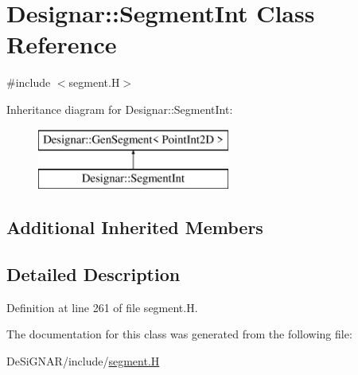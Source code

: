 \hypertarget{class_designar_1_1_segment_int}{}\section{Designar\+:\+:Segment\+Int Class Reference}
\label{class_designar_1_1_segment_int}


{\ttfamily \#include $<$segment.\+H$>$}

Inheritance diagram for Designar\+:\+:Segment\+Int\+:\begin{figure}[H]
\begin{center}
\leavevmode
\includegraphics[height=2.000000cm]{class_designar_1_1_segment_int}
\end{center}
\end{figure}
\subsection*{Additional Inherited Members}


\subsection{Detailed Description}


Definition at line 261 of file segment.\+H.



The documentation for this class was generated from the following file\+:\begin{DoxyCompactItemize}
\item 
De\+Si\+G\+N\+A\+R/include/\hyperlink{segment_8_h}{segment.\+H}\end{DoxyCompactItemize}
